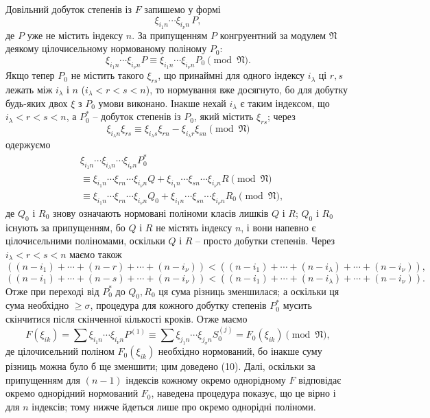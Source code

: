 \documentclass[11pt]{article}
\providecommand{\frN}{\mathfrak N}
\begin{document}
Довільний добуток степенів із \(F\) запишемо у формі
\[
        \xi_{i_1n}\cdots\xi_{i_\nu n}\,P,
\]
де \(P\) уже не містить індексу \(n\). За припущенням \(P\) конгруентний за модулем \(\frN\) деякому цілочисельному нормованому поліному \(P_0\):
\[
        \xi_{i_1n}\cdots\xi_{i_\nu n}P
        \equiv
        \xi_{i_1n}\cdots\xi_{i_\nu n}P_0
        \pmod{\frN}.
\]
Якщо тепер \(P_0\) не містить такого \(\xi_{rs}\), що принаймні для одного індексу \(i_\lambda\) ці \(r,s\) лежать між \(i_\lambda\) і \(n\) (\(i_\lambda<r<s<n\)), то нормування вже досягнуто, бо для добутку будь-яких двох \(\xi\) з \(P_0\) умови виконано. Інакше нехай \(i_\lambda\) є таким індексом, що \(i_\lambda<r<s<n\), а \(P_0^*\) -- добуток степенів із \(P_0\), який містить \(\xi_{rs}\); через
\[
        \xi_{i_\lambda n}\xi_{rs}\equiv
        \xi_{i_\lambda s}\xi_{rn}-\xi_{i_\lambda r}\xi_{sn}
        \pmod{\frN}
\]
одержуємо
\begin{align*}
 &\xi_{i_1n}\cdots\xi_{i_\lambda n}\cdots\xi_{i_\nu n}P_0^*\\
 &\equiv
 \xi_{i_1n}\cdots\xi_{rn}\cdots\xi_{i_\nu n}Q
 +
 \xi_{i_1n}\cdots\xi_{sn}\cdots\xi_{i_\nu n}R
 \pmod{\frN}\\
 &\equiv
 \xi_{i_1n}\cdots\xi_{rn}\cdots\xi_{i_\nu n}Q_0
 +
 \xi_{i_1n}\cdots\xi_{sn}\cdots\xi_{i_\nu n}R_0
 \pmod{\frN},
\end{align*}
де \(Q_0\) і \(R_0\) знову означають нормовані поліноми класів лишків \(Q\) і \(R\); \(Q_0\) і \(R_0\) існують за припущенням, бо \(Q\) і \(R\) не містять індексу \(n\), і вони напевно є цілочисельними поліномами, оскільки \(Q\) і \(R\) -- просто добутки степенів. Через \(i_\lambda<r<s<n\) маємо також
\[
 ((n-i_1)+\cdots+(n-r)+\cdots+(n-i_\nu))
 <
 ((n-i_1)+\cdots+(n-i_\lambda)+\cdots+(n-i_\nu)),
\]
\[
 ((n-i_1)+\cdots+(n-s)+\cdots+(n-i_\nu))
 <
 ((n-i_1)+\cdots+(n-i_\lambda)+\cdots+(n-i_\nu)).
\]
Отже при переході від \(P_0^*\) до \(Q_0,R_0\) ця сума різниць зменшилася; а оскільки ця сума необхідно \(\ge \sigma\), процедура для кожного добутку степенів \(P_0^*\) мусить скінчитися після скінченної кількості кроків. Отже маємо
\[
        F(\xi_{ik})
        =
        \sum \xi_{i_1n}\cdots\xi_{i_\nu n}P^{(1)}
        \equiv
        \sum \xi_{j_1n}\cdots\xi_{j_\sigma n}S_0^{(j)}
        =
        F_0(\xi_{ik})\pmod{\frN},
\]
де цілочисельний поліном \(F_0(\xi_{ik})\) необхідно нормований, бо інакше суму різниць можна було б ще зменшити; цим доведено (10). Далі, оскільки за припущенням для \((n-1)\) індексів кожному окремо однорідному \(F\) відповідає окремо однорідний нормований \(F_0\), наведена процедура показує, що це вірно і для \(n\) індексів; тому нижче йдеться лише про окремо однорідні поліноми.
\end{document}
